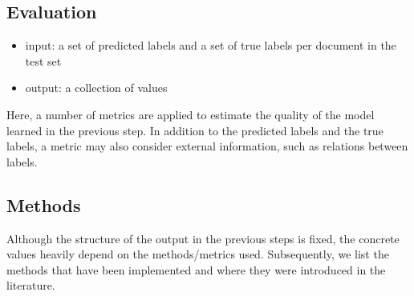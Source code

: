 \documentclass{article}
\begin{document}
\subsection{Evaluation}
\begin{itemize}
  \item input: a set of predicted labels and a set of true labels per document
  in the test set
  \item output: a collection of values
\end{itemize}
Here, a number of metrics are applied to estimate the quality of the model
learned in the previous step.
In addition to the predicted labels and the true
labels, a metric may also consider external information, such as relations
between labels.

\subsection{Methods}
Although the structure of the output in the previous steps is fixed, the
concrete values heavily depend on the methods/metrics used. Subsequently, we
list the methods that have been implemented and where they were introduced in
the literature.
\end{document}
